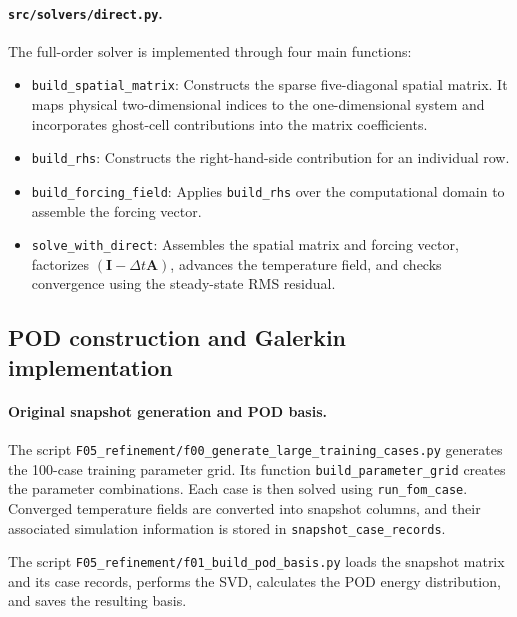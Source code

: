 \paragraph{\texttt{src/solvers/direct.py}.}

The full-order solver is implemented through four
main functions:
\begin{itemize}
    \item \texttt{build\_spatial\_matrix}: Constructs
    the sparse five-diagonal spatial matrix. It maps
    physical two-dimensional indices to the
    one-dimensional system and incorporates
    ghost-cell contributions into the matrix
    coefficients.

    \item \texttt{build\_rhs}: Constructs the
    right-hand-side contribution for an individual
    row.

    \item \texttt{build\_forcing\_field}: Applies
    \texttt{build\_rhs} over the computational domain
    to assemble the forcing vector.

    \item \texttt{solve\_with\_direct}: Assembles
    the spatial matrix and forcing vector, factorizes
    $(\mathbf{I}-\Delta t\mathbf{A})$, advances the
    temperature field, and checks convergence using
    the steady-state RMS residual.
\end{itemize}

\subsection{POD construction and Galerkin implementation}

\paragraph{Original snapshot generation and POD basis.}

The script
\texttt{F05\_refinement/f00\_generate\_large\_training\_cases.py}
generates the 100-case training parameter grid. Its
function \texttt{build\_parameter\_grid} creates the
parameter combinations. Each case is then solved
using \texttt{run\_fom\_case}. Converged temperature
fields are converted into snapshot columns, and
their associated simulation information is stored
in \texttt{snapshot\_case\_records}.

The script
\texttt{F05\_refinement/f01\_build\_pod\_basis.py}
loads the snapshot matrix and its case records,
performs the SVD, calculates the POD energy
distribution, and saves the resulting basis.

